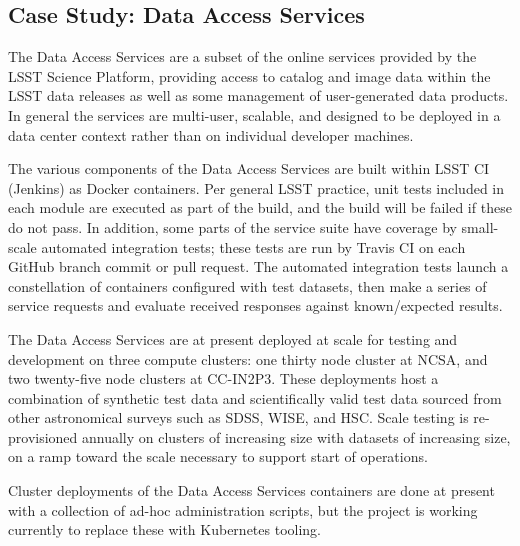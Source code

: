 \subsection{Case Study: Data Access Services}

The Data Access Services are a subset of the online services provided by the LSST Science Platform,\cite{LSE-319} providing
access to catalog and image data within the LSST data releases as well as some management of user-generated
data products.  In general the services are multi-user, scalable, and designed to be deployed in a data
center context rather than on individual developer machines.

The various components of the Data Access Services are built within LSST CI (Jenkins) as Docker containers.
Per general LSST practice, unit tests included in each module are executed as part of the build, and the build
will be failed if these do not pass.  In addition, some parts of the service suite have coverage by small-
scale automated integration tests; these tests are run by Travis CI on each GitHub branch commit or pull
request.  The automated integration tests launch a constellation of containers configured with test datasets,
then make a series of service requests and evaluate received responses against known/expected results.

The Data Access Services are at present deployed at scale for testing and development on three compute
clusters: one thirty node cluster at NCSA, and two twenty-five node clusters at CC-IN2P3.  These deployments
host a combination of synthetic test data and scientifically valid test data sourced from other astronomical
surveys such as SDSS, WISE, and HSC.  Scale testing is re-provisioned annually on clusters of increasing size
with datasets of increasing size, on a ramp toward the scale necessary to support start of operations.

Cluster deployments of the Data Access Services containers are done at present with a collection of ad-hoc
administration scripts, but the project is working currently to replace these with Kubernetes tooling.

